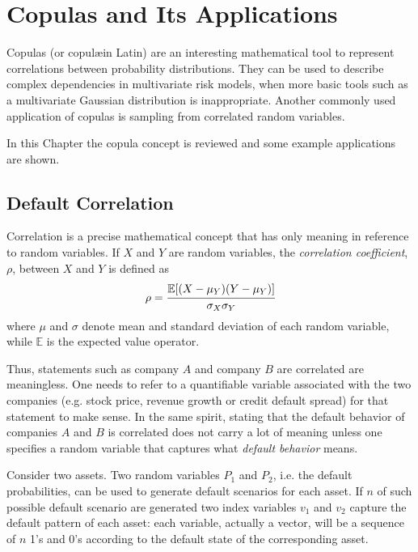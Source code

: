 \chapter{Copulas and Its Applications}

Copulas (or copul\ae in Latin) are an interesting mathematical tool to represent correlations between probability distributions. They can be used to describe complex dependencies in multivariate risk models, when more basic tools such as a multivariate Gaussian distribution is inappropriate. Another commonly used application of copulas is sampling from correlated random variables.

In this Chapter the copula concept is reviewed and some example applications are shown. 

\section{Default Correlation}\label{sec:default_correlation}
Correlation is a precise mathematical concept that has only meaning in reference to random variables. If $X$ and $Y$ are random variables, the \emph{correlation coefficient}, $\rho$, between $X$ and $Y$ is defined as
\begin{equation}
\rho = \cfrac{\mathbb{E}[(X-\mu_Y)(Y-\mu_Y)]}{\sigma_X \sigma_Y}
\label{eq:correlation_coefficient}
\end{equation}
where $\mu$ and $\sigma$ denote mean and standard deviation of each random variable, while $\mathbb{E}$ is the expected value operator.

Thus, statements such as company $A$ and company $B$ are correlated are meaningless. One needs to refer to a quantifiable variable associated with the two companies (e.g. stock price, revenue growth or credit default spread) for that statement to make sense.
In the same spirit, stating that the default behavior of companies $A$ and $B$ is correlated does not carry a lot of meaning unless one specifies a random variable that captures what \emph{default behavior} means. %

Consider two assets. Two random variables $P_1$ and $P_2$, i.e. the default probabilities, can be used to generate default scenarios for each asset. If $n$ of such possible default scenario are generated two index variables $v_1$ and $v_2$ capture the default pattern of each asset: each variable, actually a vector, will be a sequence of $n$ 1’s and 0’s according to the default state of the corresponding asset.

